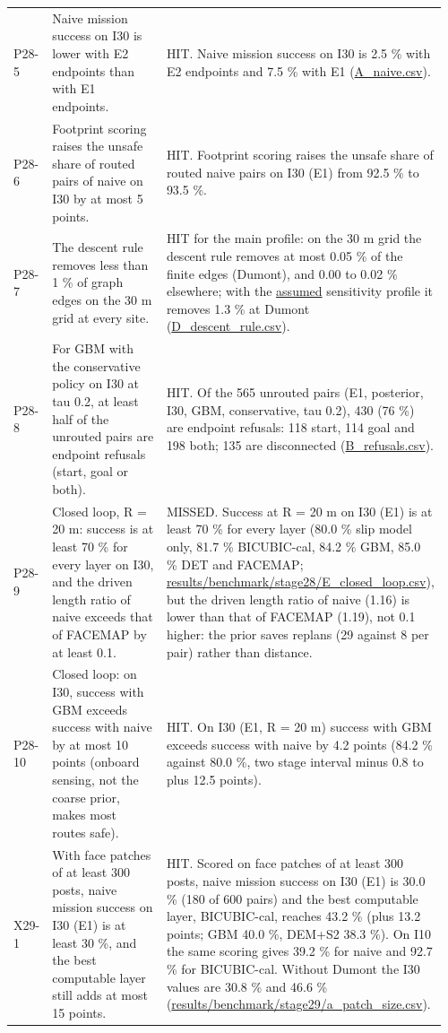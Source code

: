 \documentclass[10pt]{article}
\begin{document}
\begin{longtable}{@{}p{0.08\linewidth}p{0.42\linewidth}p{0.46\linewidth}@{}}
P28-5 & Naive mission success on I30 is lower with E2 endpoints than with E1 endpoints. & HIT. Naive mission success on I30 is 2.5 \% with E2 endpoints and 7.5 \% with E1 (\url{A_naive.csv}). \\
P28-6 & Footprint scoring raises the unsafe share of routed pairs of naive on I30 by at most 5 points. & HIT. Footprint scoring raises the unsafe share of routed naive pairs on I30 (E1) from 92.5 \% to 93.5 \%. \\
P28-7 & The descent rule removes less than 1 \% of graph edges on the 30 m grid at every site. & HIT for the main profile: on the 30 m grid the descent rule removes at most 0.05 \% of the finite edges (Dumont), and 0.00 to 0.02 \% elsewhere; with the \url{assumed} sensitivity profile it removes 1.3 \% at Dumont (\url{D_descent_rule.csv}). \\
P28-8 & For GBM with the conservative policy on I30 at tau 0.2, at least half of the unrouted pairs are endpoint refusals (start, goal or both). & HIT. Of the 565 unrouted pairs (E1, posterior, I30, GBM, conservative, tau 0.2), 430 (76 \%) are endpoint refusals: 118 start, 114 goal and 198 both; 135 are disconnected (\url{B_refusals.csv}). \\
P28-9 & Closed loop, R = 20 m: success is at least 70 \% for every layer on I30, and the driven length ratio of naive exceeds that of FACEMAP by at least 0.1. & MISSED. Success at R = 20 m on I30 (E1) is at least 70 \% for every layer (80.0 \% slip model only, 81.7 \% BICUBIC-cal, 84.2 \% GBM, 85.0 \% DET and FACEMAP; \url{results/benchmark/stage28/E_closed_loop.csv}), but the driven length ratio of naive (1.16) is lower than that of FACEMAP (1.19), not 0.1 higher: the prior saves replans (29 against 8 per pair) rather than distance. \\
P28-10 & Closed loop: on I30, success with GBM exceeds success with naive by at most 10 points (onboard sensing, not the coarse prior, makes most routes safe). & HIT. On I30 (E1, R = 20 m) success with GBM exceeds success with naive by 4.2 points (84.2 \% against 80.0 \%, two stage interval minus 0.8 to plus 12.5 points). \\
X29-1 & With face patches of at least 300 posts, naive mission success on I30 (E1) is at least 30 \%, and the best computable layer still adds at most 15 points. & HIT. Scored on face patches of at least 300 posts, naive mission success on I30 (E1) is 30.0 \% (180 of 600 pairs) and the best computable layer, BICUBIC-cal, reaches 43.2 \% (plus 13.2 points; GBM 40.0 \%, DEM+S2 38.3 \%). On I10 the same scoring gives 39.2 \% for naive and 92.7 \% for BICUBIC-cal. Without Dumont the I30 values are 30.8 \% and 46.6 \% (\url{results/benchmark/stage29/a_patch_size.csv}). \\

\end{longtable}
\end{document}
